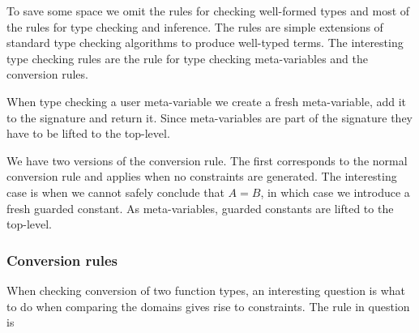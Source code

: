 To save some space we omit the rules for checking well-formed types and most of
the rules for type checking and inference. The rules are simple extensions of
standard type checking algorithms to produce well-typed terms. The interesting
type checking rules are the rule for type checking meta-variables and the
conversion rules.


When type checking a user meta-variable we create a fresh meta-variable, add it
to the signature and return it. Since meta-variables are part of the signature
they have to be lifted to the top-level.

We have two versions of the conversion rule. The first corresponds to the
normal conversion rule and applies when no constraints are generated. The
interesting case is when we cannot safely conclude that $A = B$, in which case
we introduce a fresh guarded constant. As meta-variables, guarded constants
are lifted to the top-level.

\subsubsection{Conversion rules}

When checking conversion of two function types, an interesting question is what
to do when comparing the domains gives rise to constraints. The rule in question is


